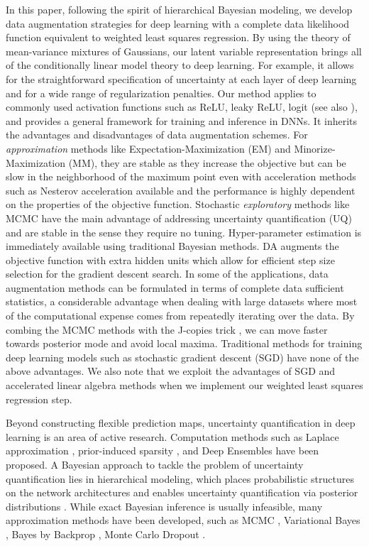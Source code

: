 \documentclass[ba]{imsart}
\numberwithin{equation}{section}
\theoremstyle{plain}
\begin{document}
In this paper, following the spirit of  hierarchical Bayesian modeling, we develop data augmentation strategies for deep learning with a complete data likelihood function equivalent to weighted least squares regression. By using the theory of mean-variance mixtures of Gaussians, our latent variable representation brings all of the conditionally linear model theory to deep learning. For example, it allows for the straightforward specification of uncertainty at each layer of deep learning and for a wide range of regularization penalties.  Our method applies to commonly used activation functions such as ReLU, leaky ReLU, logit (see also \citet{gan2015learning}), and provides a general framework for training and inference in DNNs. It inherits the advantages and disadvantages of data augmentation schemes. For \textit{approximation} methods like Expectation-Maximization (EM) and Minorize-Maximization (MM), they are stable as they increase the objective but can be slow in the neighborhood of the maximum point even with acceleration methods such as Nesterov acceleration available and the performance is highly dependent on the properties of the objective function. Stochastic \textit{exploratory} methods like MCMC have the main advantage of addressing uncertainty quantification (UQ) and are stable in the sense they require no tuning.  Hyper-parameter estimation is immediately available using traditional Bayesian methods. DA augments the objective function with  extra hidden units which allow for efficient step size selection for the gradient descent search. In some of the applications, data augmentation methods can be formulated in terms of complete data sufficient statistics, a considerable advantage when dealing with large datasets where most of the computational expense comes from repeatedly iterating over the data. By combing the MCMC methods with the J-copies trick \citep{jacquier2007mcmc}, we can move faster towards posterior mode and avoid local maxima. Traditional methods for training deep learning models such as  stochastic gradient descent (SGD)  have none of the above advantages. We also note that we exploit the advantages of SGD and accelerated linear algebra methods when we implement our weighted least squares regression step.

\iffalse
Beyond constructing flexible prediction maps, uncertainty quantification in deep learning is  an area of active research. Computation methods such as Laplace approximation \citep{foong2019between}, prior-induced sparsity \citep{wang2020uncertainty, sun2021consistent}, and Deep Ensembles \citep{lakshminarayanan2017simple} have been proposed. 
A Bayesian approach to tackle the  problem of uncertainty quantification lies in hierarchical modeling, which places probabilistic structures on the network architectures  and enables uncertainty quantification via posterior distributions \citep{neal1993bayesian}. While exact  Bayesian inference is usually infeasible, many approximation methods have been developed, such as MCMC \citep{neal2011mcmc}, Variational Bayes \citep{ullrich2017soft}, Bayes by Backprop \citep{blundell2015weight},  Monte Carlo Dropout \citep{gal2016dropout}. 
\end{document}
